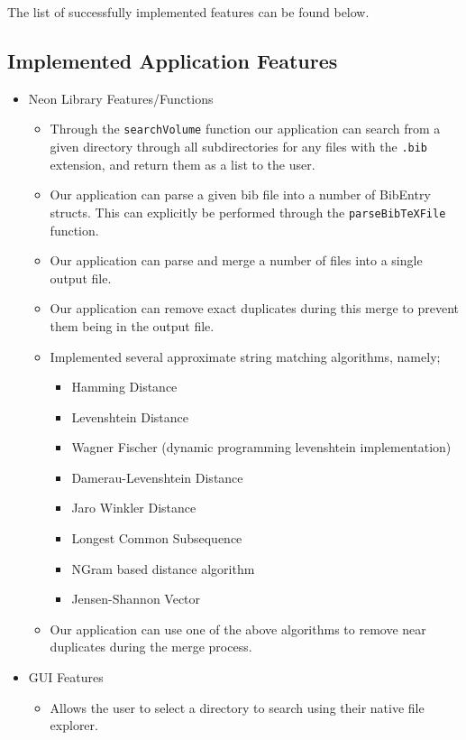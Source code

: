 \documentclass[a4paper,11pt]{article}
\newcommand{\code}[1]{\colorbox{codegray}{\texttt{#1}}}
\begin{document}
The list of successfully implemented features can be found below.

\subsection{Implemented Application Features}

\begin{itemize}
    \item Neon Library Features/Functions
    \begin{itemize}
        \item Through the \code{searchVolume} function our application can search from a given directory through all subdirectories for any files with the \code{.bib} extension, and return them as a list to the user.
        \item Our application can parse a given bib file into a number of BibEntry structs. This can explicitly be performed through the \code{parseBibTeXFile} function.
        \item Our application can parse and merge a number of files into a single output file.
        \item Our application can remove exact duplicates during this merge to prevent them being in the output file.
        \item Implemented several approximate string matching algorithms, namely;
        \begin{itemize}
            \item Hamming Distance
            \item Levenshtein Distance
            \item Wagner Fischer (dynamic programming levenshtein implementation)
            \item Damerau-Levenshtein Distance
            \item Jaro Winkler Distance
            \item Longest Common Subsequence
            \item NGram based distance algorithm
            \item Jensen-Shannon Vector
        \end{itemize}
        \item Our application can use one of the above algorithms to remove near duplicates during the merge process.
    \end{itemize}
    \item GUI Features
    \begin{itemize}
        \item Allows the user to select a directory to search using their native file explorer.

\end{itemize}
\end{itemize}
\end{document}
